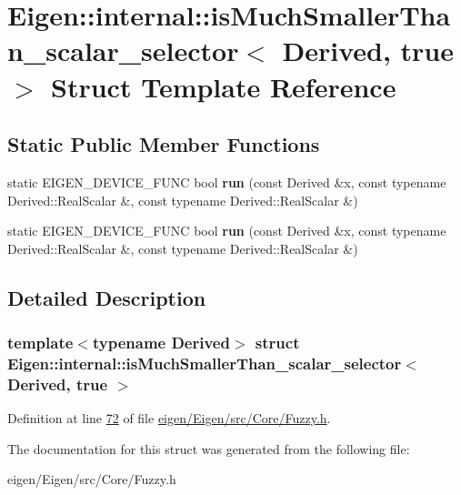 \hypertarget{struct_eigen_1_1internal_1_1is_much_smaller_than__scalar__selector_3_01_derived_00_01true_01_4}{}\section{Eigen\+:\+:internal\+:\+:is\+Much\+Smaller\+Than\+\_\+scalar\+\_\+selector$<$ Derived, true $>$ Struct Template Reference}
\label{struct_eigen_1_1internal_1_1is_much_smaller_than__scalar__selector_3_01_derived_00_01true_01_4}
\subsection*{Static Public Member Functions}
\begin{DoxyCompactItemize}
\item 
\mbox{\label{struct_eigen_1_1internal_1_1is_much_smaller_than__scalar__selector_3_01_derived_00_01true_01_4_ac498f1f78aa18e7cd5592179354c8406}} 
static E\+I\+G\+E\+N\+\_\+\+D\+E\+V\+I\+C\+E\+\_\+\+F\+U\+NC bool {\bfseries run} (const Derived \&x, const typename Derived\+::\+Real\+Scalar \&, const typename Derived\+::\+Real\+Scalar \&)
\item 
\mbox{\label{struct_eigen_1_1internal_1_1is_much_smaller_than__scalar__selector_3_01_derived_00_01true_01_4_ac498f1f78aa18e7cd5592179354c8406}} 
static E\+I\+G\+E\+N\+\_\+\+D\+E\+V\+I\+C\+E\+\_\+\+F\+U\+NC bool {\bfseries run} (const Derived \&x, const typename Derived\+::\+Real\+Scalar \&, const typename Derived\+::\+Real\+Scalar \&)
\end{DoxyCompactItemize}


\subsection{Detailed Description}
\subsubsection*{template$<$typename Derived$>$\newline
struct Eigen\+::internal\+::is\+Much\+Smaller\+Than\+\_\+scalar\+\_\+selector$<$ Derived, true $>$}



Definition at line \hyperlink{eigen_2_eigen_2src_2_core_2_fuzzy_8h_source_l00072}{72} of file \hyperlink{eigen_2_eigen_2src_2_core_2_fuzzy_8h_source}{eigen/\+Eigen/src/\+Core/\+Fuzzy.\+h}.



The documentation for this struct was generated from the following file\+:\begin{DoxyCompactItemize}
\item 
eigen/\+Eigen/src/\+Core/\+Fuzzy.\+h\end{DoxyCompactItemize}
